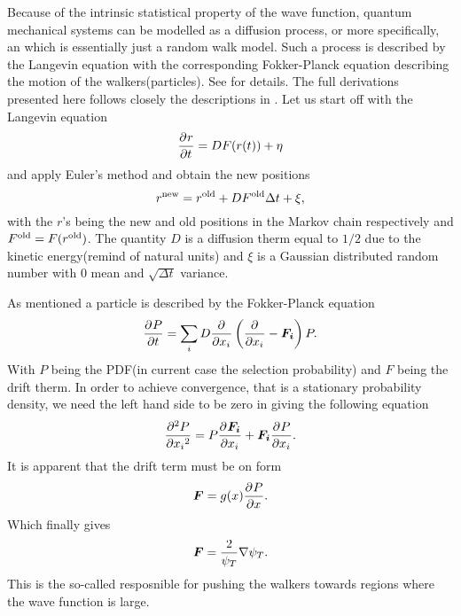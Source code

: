         Because of the intrinsic statistical property of the wave function,
        quantum mechanical systems can be modelled as a diffusion process, or
        more specifically, an  which is
        essentially just a random walk model. Such a process is described by
        the Langevin equation with the corresponding Fokker-Planck equation
        describing the motion of the walkers(particles). See \cite{numstoch,
        compphysThijssen, vmc} for details. The full derivations presented here
        follows closely the descriptions in \cite{compphysThijssen, vmc}. Let
        us start off with the Langevin equation
            \begin{equation}
                \langevin
                \label{eq:langevin}
            \end{equation}
        and apply Euler's method and obtain the new positions
            \begin{equation}
                r^{\text{new}} = r^{\text{old}} + DF^{\text{old}}\Delta t + \xi,
                \label{eq:rnewdef}
            \end{equation}
        with the $r$'s being the new and old positions in the Markov chain
        respectively and $F^{\text{old}}=F(r^{\text{old}})$. The quantity $D$ is a diffusion
        therm equal to $1/2$ due to the kinetic energy(remind of natural units)
        and $\xi$ is a Gaussian distributed random number with $0$ mean and
        $\sqrt{\Delta t}$ variance.

        As mentioned a particle is described by the Fokker-Planck equation
            \begin{equation}
                \FokkerPlanck.
                \label{eq:FokkerPlanckDef}
            \end{equation}
        With $P$ being the PDF(in current case the selection probability) and
        $F$ being the drift therm. In order to achieve convergence, that is a
        stationary probability density, we need the left hand side to be zero
        in  giving the following equation
            \begin{equation}
                \prd{x_i}[P][2] = P\prd{x_i}[\mb{F_i}] + \mb{F_i}\prd{x_i}[P].
            \end{equation}
        It is apparent that the drift term must be on form 
            \begin{equation}
                \mb{F}=g(x)\prd{x}[P].
            \end{equation}
        Which finally gives
            \begin{equation}
                \boldsymbol{{F}} = \frac{2}{\psi_T}\nabla \psi_T.
                \label{eq:qForceDef}
            \end{equation}
        This is the so-called  resposnible for pushing the
        walkers towards regions where the wave function is large.

